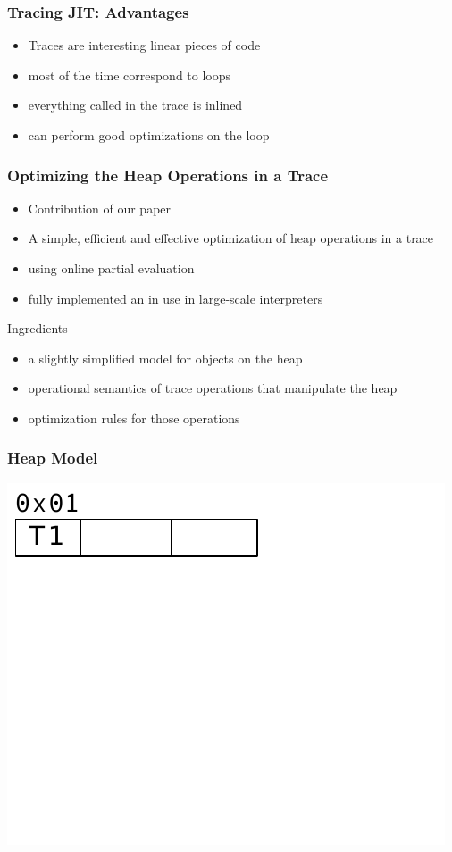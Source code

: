 \documentclass[utf8x]{beamer}
\begin{document}
\begin{frame}
  \frametitle{Tracing JIT: Advantages}
  \begin{itemize}
      \item Traces are interesting linear pieces of code
      \item most of the time correspond to loops
      \item everything called in the trace is inlined
      \item can perform good optimizations on the loop
  \end{itemize}
\end{frame}

\begin{frame}
  \frametitle{Optimizing the Heap Operations in a Trace}
  \begin{itemize}
      \item Contribution of our paper
      \item A simple, efficient and effective optimization of heap operations in a trace
      \item using online partial evaluation
      \item fully implemented an in use in large-scale interpreters
  \end{itemize}
  \pause
  \begin{block}{Ingredients}
      \begin{itemize}
          \item a slightly simplified model for objects on the heap
          \item operational semantics of trace operations that manipulate the heap
          \item optimization rules for those operations
      \end{itemize}
  \end{block}
\end{frame}

\begin{frame}
  \frametitle{Heap Model}
  \includegraphics[scale=0.9]{figures/heap01}
\end{frame}
\end{document}
